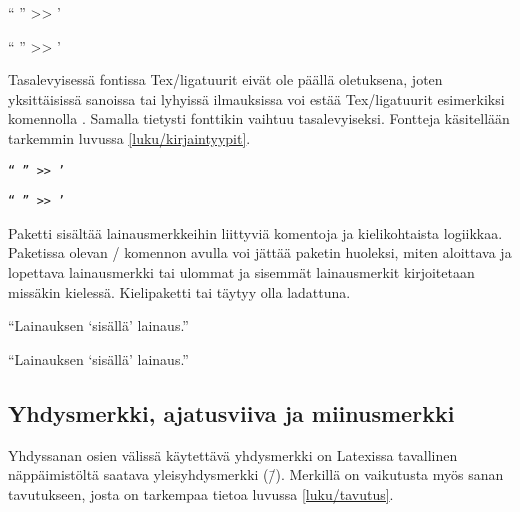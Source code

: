 \begin{koodilohkosis}
{ `` '' >> '}
\end{koodilohkosis}

\begin{tulossis}
  { `` '' >> '}
\end{tulossis}

\noindent
Tasalevyisessä fontissa Tex\-/ligatuurit eivät ole päällä oletuksena,
joten yksittäisissä sanoissa tai lyhyissä ilmauksissa voi estää
Tex\-/ligatuurit esimerkiksi komennolla . Samalla
tietysti fonttikin vaihtuu tasalevyiseksi. Fontteja käsitellään
tarkemmin luvussa \ref{luku/kirjaintyypit}.

\begin{koodilohkosis}
\texttt{`` '' >> '}
\end{koodilohkosis}

\begin{tulossis}
  \texttt{`` '' >> '}
\end{tulossis}

\noindent
Paketti  sisältää lainausmerkkeihin liittyviä
komentoja ja kielikohtaista logiikkaa. Paketissa olevan
\-/ komennon avulla voi jättää paketin huoleksi, miten
aloittava ja lopettava lainausmerkki tai ulommat ja sisemmät
lainausmerkit kirjoitetaan missäkin kielessä. Kielipaketti
 tai  täytyy olla ladattuna.

\begin{koodilohkosis}
\usepackage{polyglossia} \setdefaultlanguage{finnish}
\usepackage[autostyle=true]{csquotes}
\enquote{Lainauksen \enquote{sisällä} lainaus.}
\end{koodilohkosis}

\begin{tulossis}
  \enquote{Lainauksen \enquote{sisällä} lainaus.}
\end{tulossis}

\subsection{Yhdysmerkki, ajatusviiva ja miinusmerkki}
\label{luku/yhdys-ajatus-miinus}

Yhdyssanan osien välissä käytettävä yhdysmerkki on Latexissa tavallinen
näppäimistöltä saatava yleisyhdysmerkki (\=/). Merkillä on vaikutusta
myös sanan tavutukseen, josta on tarkempaa tietoa luvussa
\ref{luku/tavutus}.

